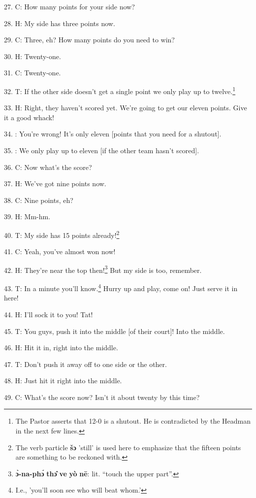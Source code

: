 27. C: How many points for your side now?

28. H: My side has three points now.

29. C: Three, eh? How many points do you need to win?

30. H: Twenty-one.

31. C: Twenty-one.

32. T: If the other side doesn't get a single point we only play up to twelve.\footnote{The Pastor asserts that 12-0 is a shutout. He is contradicted by the Headman in the next few lines.}

33. H: Right, they haven't scored yet. We're going to get our eleven points. Give
it a good whack!

34. : You're wrong! It's only eleven [points that you need for a shutout].

35. : We only play up to eleven [if the other team hasn't scored].

36. C: Now what's the score?

37. H: We've got nine points now.

38. C: Nine points, eh?

39. H: Mm-hm.


40. T: My side has 15 points already!\footnote{The verb particle \textbf{šɔ} 'still' is used here to emphasize that the fifteen points are something to be reckoned with.}

41. C: Yeah, you've almost won now!

42. H: They're near the top then!\footnote{\textbf{ɔ̀-na-phɔ́} \textbf{thɔ̂} \textbf{ve} \textbf{yò} \textbf{nē}: lit. ``touch the upper part''.} But my side is too, remember.

43. T: In a minute you'll know.\footnote{I.e., 'you'll soon see who will beat whom.'} Hurry up and play, come on! Just serve it in
here!

44. H: I'll sock it to you! Tat!


45. T: You guys, push it into the middle [of their court]! Into the middle.

46. H: Hit it in, right into the middle.

47. T: Don't push it away off to one side or the other.

48. H: Just hit it right into the middle.

49. C: What's the score now? Isn't it about twenty by this time?

